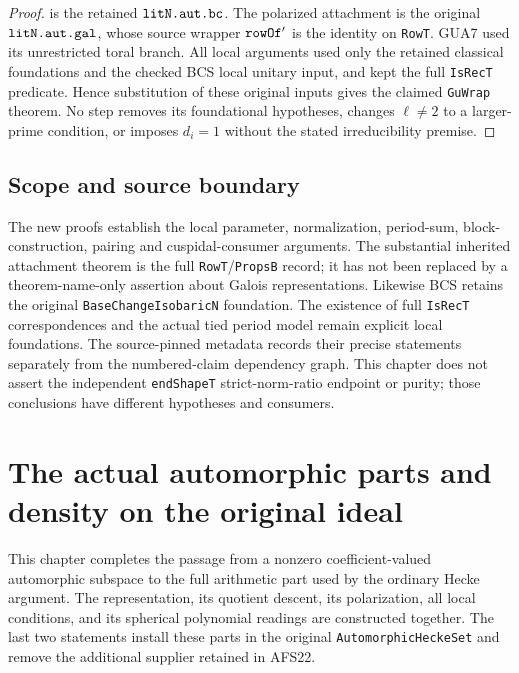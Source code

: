 \documentclass[11pt,a4paper]{article}
\numberwithin{equation}{section}
\theoremstyle{remark}\newtheorem{remark}[theorem]{Remark}
\begin{document}
\begin{proof}
is the retained $\texttt{lit\allowbreak N.\allowbreak aut.\allowbreak bc}$.  The
polarized attachment is the original
$\texttt{lit\allowbreak N.\allowbreak aut.\allowbreak gal}$, whose source wrapper
$\texttt{row\allowbreak Of}'$ is the identity on \texttt{Row\allowbreak T}.
GUA7 used its unrestricted toral branch.  All
local arguments used only the retained classical
foundations and the checked BCS local unitary
input, and kept the full \texttt{Is\allowbreak Rec\allowbreak T}
predicate.  Hence substitution of these original
inputs gives the claimed \texttt{Gu\allowbreak Wrap} theorem.
No step removes its foundational hypotheses, changes
$\ell\ne2$ to a larger-prime condition, or imposes
$d_i=1$ without the stated irreducibility premise.
\end{proof}

\subsection{Scope and source boundary}

The new proofs establish the local parameter, normalization,
period-sum, block-construction, pairing and cuspidal-consumer
arguments.  The substantial inherited attachment theorem is
the full \texttt{Row\allowbreak T}/\texttt{Props\allowbreak B} record; it has not
been replaced by a theorem-name-only assertion about Galois
representations.  Likewise BCS retains the original
\texttt{Base\allowbreak Change\allowbreak Isobaric\allowbreak N} foundation.  The existence of
full \texttt{Is\allowbreak Rec\allowbreak T} correspondences and the actual tied
period model remain explicit local foundations.  The
source-pinned metadata records their precise statements
separately from the numbered-claim dependency graph.
This chapter does not assert the independent
\texttt{end\allowbreak Shape\allowbreak T} strict-norm-ratio endpoint or purity;
those conclusions have different hypotheses and consumers.


\section{The actual automorphic parts and density on the original ideal}
\label{sec:automorphic-installation-v44}

This chapter completes the passage from a nonzero coefficient-valued
automorphic subspace to the full arithmetic part used by the ordinary
Hecke argument.  The representation, its quotient descent, its
polarization, all local conditions, and its spherical polynomial
readings are constructed together.  The last two statements install
these parts in the original \texttt{Automorphic\allowbreak Hecke\allowbreak Set} and remove
the additional supplier retained in AFS22.
\end{document}
